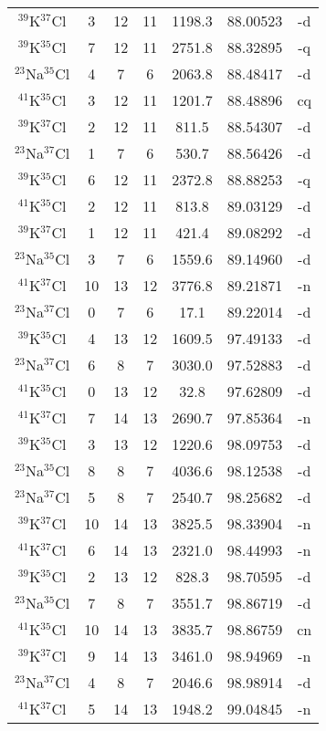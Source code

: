 \begin{table*}[htp]
\begin{tabular}{ccccccc}
$^{39}$K$^{37}$Cl & 3 & 12 & 11 & 1198.3 & 88.00523 & -d \\
$^{39}$K$^{35}$Cl & 7 & 12 & 11 & 2751.8 & 88.32895 & -q \\
$^{23}$Na$^{35}$Cl & 4 & 7 & 6 & 2063.8 & 88.48417 & -d \\
$^{41}$K$^{35}$Cl & 3 & 12 & 11 & 1201.7 & 88.48896 & cq \\
$^{39}$K$^{37}$Cl & 2 & 12 & 11 & 811.5 & 88.54307 & -d \\
$^{23}$Na$^{37}$Cl & 1 & 7 & 6 & 530.7 & 88.56426 & -d \\
$^{39}$K$^{35}$Cl & 6 & 12 & 11 & 2372.8 & 88.88253 & -q \\
$^{41}$K$^{35}$Cl & 2 & 12 & 11 & 813.8 & 89.03129 & -d \\
$^{39}$K$^{37}$Cl & 1 & 12 & 11 & 421.4 & 89.08292 & -d \\
$^{23}$Na$^{35}$Cl & 3 & 7 & 6 & 1559.6 & 89.14960 & -d \\
$^{41}$K$^{37}$Cl & 10 & 13 & 12 & 3776.8 & 89.21871 & -n \\
$^{23}$Na$^{37}$Cl & 0 & 7 & 6 & 17.1 & 89.22014 & -d \\
$^{39}$K$^{35}$Cl & 4 & 13 & 12 & 1609.5 & 97.49133 & -d \\
$^{23}$Na$^{37}$Cl & 6 & 8 & 7 & 3030.0 & 97.52883 & -d \\
$^{41}$K$^{35}$Cl & 0 & 13 & 12 & 32.8 & 97.62809 & -d \\
$^{41}$K$^{37}$Cl & 7 & 14 & 13 & 2690.7 & 97.85364 & -n \\
$^{39}$K$^{35}$Cl & 3 & 13 & 12 & 1220.6 & 98.09753 & -d \\
$^{23}$Na$^{35}$Cl & 8 & 8 & 7 & 4036.6 & 98.12538 & -d \\
$^{23}$Na$^{37}$Cl & 5 & 8 & 7 & 2540.7 & 98.25682 & -d \\
$^{39}$K$^{37}$Cl & 10 & 14 & 13 & 3825.5 & 98.33904 & -n \\
$^{41}$K$^{37}$Cl & 6 & 14 & 13 & 2321.0 & 98.44993 & -n \\
$^{39}$K$^{35}$Cl & 2 & 13 & 12 & 828.3 & 98.70595 & -d \\
$^{23}$Na$^{35}$Cl & 7 & 8 & 7 & 3551.7 & 98.86719 & -d \\
$^{41}$K$^{35}$Cl & 10 & 14 & 13 & 3835.7 & 98.86759 & cn \\
$^{39}$K$^{37}$Cl & 9 & 14 & 13 & 3461.0 & 98.94969 & -n \\
$^{23}$Na$^{37}$Cl & 4 & 8 & 7 & 2046.6 & 98.98914 & -d \\
$^{41}$K$^{37}$Cl & 5 & 14 & 13 & 1948.2 & 99.04845 & -n \\

\end{tabular}
\end{table*}

